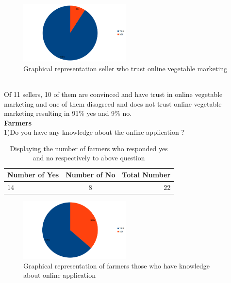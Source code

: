 \documentclass[12pt]{report}
\begin{document}
\begin{normalsize}
\begin{figure}[h]
	\centering
	\includegraphics[width=0.5\textwidth]{seller 3.png} 
	\caption{Graphical representation seller who trust online vegetable marketing  }
	\label{myLabel}		%
	\end{figure} 
\newline\\[0.1cm]Of 11 sellers, 10 of them are convinced and have trust in online vegetable marketing and one of them disagreed and does not trust online vegetable marketing resulting in 91\% yes and 9\% no.\newline\\[0.1cm]
\newpage
{\bfseries Farmers }\newline\\[0.1cm]
1)Do you have any knowledge about the online application ?\newline\\[0.1cm]
\begin{table}[h]       %
		\centering
		\begin{tabular}{ | l | c | r | } \hline
		\textbf{Number of Yes} & \textbf{Number of No} & \textbf{Total Number} \\ \hline			
		14 & 8 & 22 \\ \hline
		\end{tabular}
		\caption{Displaying the number of farmers who responded yes and no respectively to above question}
		\label{4.0}
	\end{table}
\begin{figure}[h]       %
	\centering
	\includegraphics[width=0.5\textwidth]{farmer 1.png} 
	\caption{Graphical representation of farmers those who have knowledge about online application }

\end{figure}
\end{normalsize}
\end{document}
